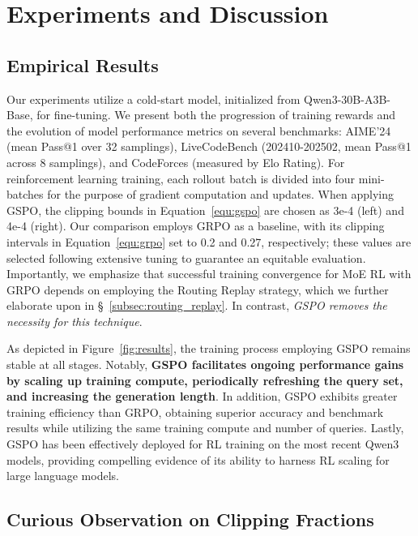 \section{Experiments and Discussion}

\subsection{Empirical Results}

Our experiments utilize a cold-start model, initialized from Qwen3-30B-A3B-Base, for fine-tuning. We present both the progression of training rewards and the evolution of model performance metrics on several benchmarks: AIME'24 (mean Pass@1 over 32 samplings), LiveCodeBench (202410-202502, mean Pass@1 across 8 samplings), and CodeForces (measured by Elo Rating). For reinforcement learning training, each rollout batch is divided into four mini-batches for the purpose of gradient computation and updates. When applying GSPO, the clipping bounds in Equation~\eqref{equ:gspo} are chosen as 3e-4 (left) and 4e-4 (right). Our comparison employs GRPO as a baseline, with its clipping intervals in Equation~\eqref{equ:grpo} set to 0.2 and 0.27, respectively; these values are selected following extensive tuning to guarantee an equitable evaluation. Importantly, we emphasize that successful training convergence for MoE RL with GRPO depends on employing the Routing Replay strategy, which we further elaborate upon in \S~\ref{subsec:routing_replay}. In contrast, \textit{GSPO removes the necessity for this technique}.

As depicted in Figure~\ref{fig:results}, the training process employing GSPO remains stable at all stages. Notably, \textbf{GSPO facilitates ongoing performance gains by scaling up training compute, periodically refreshing the query set, and increasing the generation length}. In addition, GSPO exhibits greater training efficiency than GRPO, obtaining superior accuracy and benchmark results while utilizing the same training compute and number of queries. Lastly, GSPO has been effectively deployed for RL training on the most recent Qwen3 models, providing compelling evidence of its ability to harness RL scaling for large language models.

\subsection{Curious Observation on Clipping Fractions}

